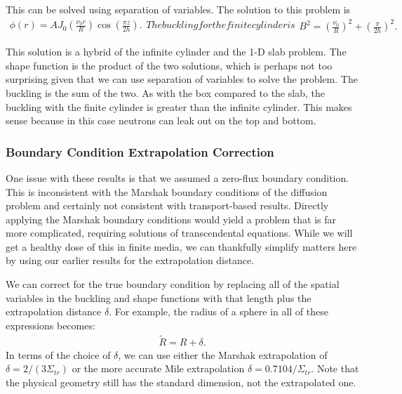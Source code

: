This can be solved using separation of variables. The solution to this problem is
\begin{subequations}
\begin{align}
  \phi(r) = A J_0 \left( \frac{\nu_0 r}{R} \right)  \cos\left( \frac{\pi z}{2 h} \right).
\end{align}
The buckling for the finite cylinder is
\begin{align}
 B^2 = \left( \frac{\nu_0}{R} \right)^2 + \left( \frac{\pi}{2h} \right)^2 .
\end{align}
\end{subequations}

This solution is a hybrid of the infinite cylinder and the 1-D slab problem. The shape function is the product of the two solutions, which is perhaps not too surprising given that we can use separation of variables to solve the problem. The buckling is the sum of the two. As with the box compared to the slab, the buckling with the finite cylinder is greater than the infinite cylinder. This makes sense because in this case neutrons can leak out on the top and bottom.

\subsubsection{Boundary Condition Extrapolation Correction}

One issue with these results is that we assumed a zero-flux boundary condition. This is inconsistent with the Marshak boundary conditions of the diffusion problem and certainly not consistent with transport-based results. Directly applying the Marshak boundary conditions would yield a problem that is far more complicated, requiring solutions of transcendental equations. While we will get a healthy dose of this in finite media, we can thankfully simplify matters here by using our earlier results for the extrapolation distance.

We can correct for the true boundary condition by replacing all of the spatial variables in the buckling and shape functions with that length plus the extrapolation distance $\delta$. For example, the radius of a sphere in all of these expressions becomes:
\begin{align}
  \tilde{R} = R + \delta .
\end{align}
In terms of the choice of $\delta$, we can use either the Marshak extrapolation of $\delta = 2/( 3 \Sigma_{tr})$ or the more accurate Mile extrapolation $\delta = 0.7104/\Sigma_{tr}$. Note that the physical geometry still has the standard dimension, not the extrapolated one.

